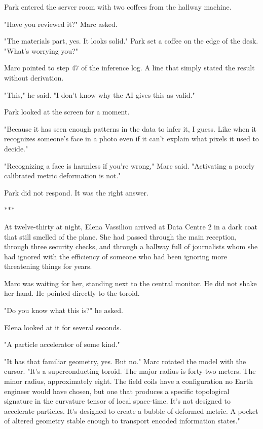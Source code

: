 \documentclass[11pt,a5paper,twoside]{book}
\begin{document}
Park entered the server room with two coffees from the hallway machine.

"Have you reviewed it?" Marc asked.

"The materials part, yes. It looks solid." Park set a coffee on the edge of the desk. "What's worrying you?"

Marc pointed to step 47 of the inference log. A line that simply stated the result without derivation.

"This," he said. "I don't know why the AI gives this as valid."

Park looked at the screen for a moment.

"Because it has seen enough patterns in the data to infer it, I guess. Like when it recognizes someone's face in a photo even if it can't explain what pixels it used to decide."

"Recognizing a face is harmless if you're wrong," Marc said. "Activating a poorly calibrated metric deformation is not."

Park did not respond. It was the right answer.

\vspace{1.5em}
\begin{center}$\ast$\quad$\ast$\quad$\ast$\end{center}
\vspace{1.5em}

At twelve-thirty at night, Elena Vassiliou arrived at Data Centre 2 in a dark coat that still smelled of the plane. She had passed through the main reception, through three security checks, and through a hallway full of journalists whom she had ignored with the efficiency of someone who had been ignoring more threatening things for years.

Marc was waiting for her, standing next to the central monitor. He did not shake her hand. He pointed directly to the toroid.

"Do you know what this is?" he asked.

Elena looked at it for several seconds.

"A particle accelerator of some kind."

"It has that familiar geometry, yes. But no." Marc rotated the model with the cursor. "It's a superconducting toroid. The major radius is forty-two meters. The minor radius, approximately eight. The field coils have a configuration no Earth engineer would have chosen, but one that produces a specific topological signature in the curvature tensor of local space-time. It's not designed to accelerate particles. It's designed to create a bubble of deformed metric. A pocket of altered geometry stable enough to transport encoded information states."
\end{document}
